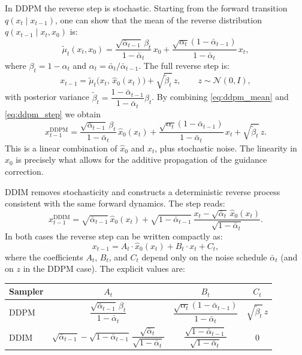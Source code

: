 \documentclass[a4paper,11pt]{article}
\theoremstyle{definition}
\theoremstyle{plain}
\theoremstyle{remark}
\begin{document}
In DDPM the reverse step is stochastic. Starting from the forward transition $q(x_t \mid x_{t-1})$, one can show that the mean of the reverse distribution $q(x_{t-1} \mid x_t, x_0)$ is:
\begin{equation}
    \tilde{\mu}_t(x_t, x_0)
    = \frac{\sqrt{\bar{\alpha}_{t-1}}\,\beta_t}{1-\bar{\alpha}_t}\,x_0
    + \frac{\sqrt{\alpha_t}(1-\bar{\alpha}_{t-1})}{1-\bar{\alpha}_t}\,x_t,
    \label{eq:ddpm_mean}
\end{equation}
where $\beta_t = 1 - \alpha_t$ and $\alpha_t = \bar{\alpha}_t / \bar{\alpha}_{t-1}$.
The full reverse step is:
\begin{equation}
    x_{t-1} = \tilde{\mu}_t\!\big(x_t,\,\hat{x}_0(x_t)\big) + \sqrt{\tilde{\beta}_t}\,z,
    \qquad z \sim \mathcal{N}(0,I),
    \label{eq:ddpm_step}
\end{equation}
with posterior variance $\tilde{\beta}_t = \dfrac{1-\bar{\alpha}_{t-1}}{1-\bar{\alpha}_t}\beta_t$.
By combining \eqref{eq:ddpm_mean} and \eqref{eq:ddpm_step} we obtain
\begin{equation}
    \boxed{x_{t-1}^{\mathrm{DDPM}}
    = \frac{\sqrt{\bar{\alpha}_{t-1}}\,\beta_t}{1-\bar{\alpha}_t}\,\hat{x}_0(x_t)
    + \frac{\sqrt{\alpha_t}(1-\bar{\alpha}_{t-1})}{1-\bar{\alpha}_t}\,x_t
    + \sqrt{\tilde{\beta}_t}\,z.}
    \label{eq:ddpm_final}
\end{equation}
This is a linear combination of $\hat{x}_0$ and $x_t$, plus stochastic noise.
The linearity in $\hat{x}_0$ is precisely what allows for the additive propagation of the guidance correction.

 
DDIM removes stochasticity and constructs a deterministic reverse process consistent with the same forward dynamics. The step reads:
\begin{equation}
    \boxed{x_{t-1}^{\mathrm{DDIM}}
    = \sqrt{\bar{\alpha}_{t-1}}\,\hat{x}_0(x_t)
    + \sqrt{1-\bar{\alpha}_{t-1}}\,
      \frac{x_t - \sqrt{\bar{\alpha}_t}\,\hat{x}_0(x_t)}{\sqrt{1-\bar{\alpha}_t}}.}
    \label{eq:ddim_final}
\end{equation}
In both cases the reverse step can be written compactly as:
\begin{equation}
    x_{t-1} = A_t \cdot \hat{x}_0(x_t) + B_t \cdot x_t + C_t,
    \label{eq:linear}
\end{equation}
where the coefficients $A_t$, $B_t$, and $C_t$ depend only on the noise schedule $\bar{\alpha}_t$
(and on $z$ in the DDPM case).
The explicit values are:

\medskip
\begin{center}
\begin{tabular}{lccc}
\toprule
\textbf{Sampler} & $A_t$ & $B_t$ & $C_t$ \\
\midrule
DDPM &
$\dfrac{\sqrt{\bar{\alpha}_{t-1}}\,\beta_t}{1-\bar{\alpha}_t}$ &
$\dfrac{\sqrt{\alpha_t}(1-\bar{\alpha}_{t-1})}{1-\bar{\alpha}_t}$ &
$\sqrt{\tilde{\beta}_t}\,z$ \\[10pt]
DDIM &
$\sqrt{\bar{\alpha}_{t-1}} - \sqrt{1-\bar{\alpha}_{t-1}}\,\dfrac{\sqrt{\bar{\alpha}_t}}{\sqrt{1-\bar{\alpha}_t}}$ &
$\dfrac{\sqrt{1-\bar{\alpha}_{t-1}}}{\sqrt{1-\bar{\alpha}_t}}$ &
$0$ \\
\bottomrule
\end{tabular}
\end{center}
\end{document}
